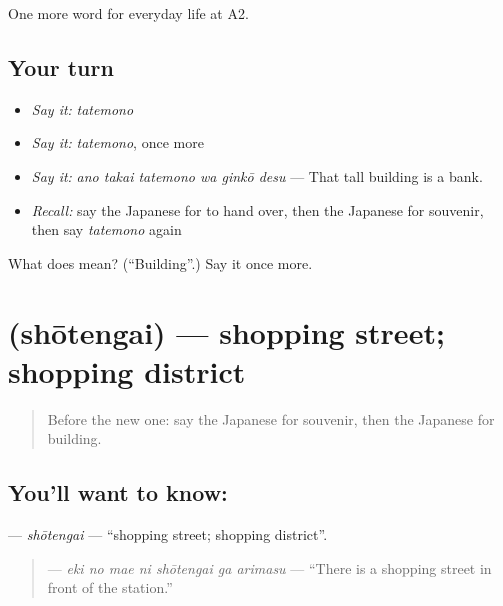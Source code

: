 \begin{grammarlens}[title={What you've built}]
One more word for everyday life at A2.
\end{grammarlens}

\subsection*{Your turn}
\begin{itemize}
\raggedright
  \item \emph{Say it:} \emph{tatemono}
  \item \emph{Say it:} \emph{tatemono}, once more
  \item \emph{Say it:} \emph{ano takai tatemono wa ginkō desu} — That tall building is a bank.
  \item \emph{Recall:} say the Japanese for to hand over, then the Japanese for souvenir, then say \emph{tatemono} again
\end{itemize}

\begin{tcolorbox}[breakable,colback=teal!4,colframe=teal!35!black,title={Before you move on}]
What does  mean? (\textquotedblleft{}Building\textquotedblright{}.) Say it once more.
\end{tcolorbox}
\section[\texorpdfstring{\ja{しょうてんがい} (shōtengai)}{しょうてんがい (shōtengai)}]{ (shōtengai) — shopping street; shopping district}

\label{lesson:JA-C190-shoutengai}



\begin{quote}
Before the new one: say the Japanese for souvenir, then the Japanese for building.
\end{quote}

\subsection*{You'll want to know: }
\textbf{} — \emph{shōtengai} — \textquotedblleft{}shopping street; shopping district\textquotedblright{}.

\begin{quote}
\textbf{   } — \emph{eki no mae ni shōtengai ga arimasu} — \textquotedblleft{}There is a shopping street in front of the station.\textquotedblright{}
\end{quote}

